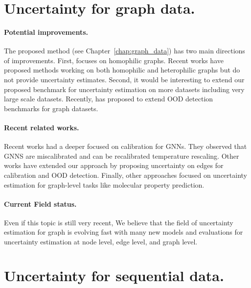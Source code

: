 \section{Uncertainty for graph data.}

\paragraph{Potential improvements.} The proposed method \GPNacro{} (see Chapter~\ref{chap:graph_data}) has two main directions of improvements. First, \GPNacro{} focuses on homophilic graphs. Recent works have proposed methods \cite{bodnar2022sheaf, giovanni2022graff} working on both homophilic and heterophilic graphs but do not provide uncertainty estimates. Second, it would be interesting to extend our proposed benchmark for uncertainty estimation on more datasets including very large scale datasets. Recently, \cite{gui2022good} has proposed to extend OOD detection benchmarks for graph datasets.


\paragraph{Recent related works.} Recent works \cite{texeira2019GNNmiscalibrated, hsu2022GNNmiscalibrated, wang2021confident} had a deeper focused on calibration for GNNs. They observed that GNNS are miscalibrated and can be recalibrated temperature rescaling. Other works \cite{zhou2022OODlink, hsu2022structure} have extended our approach by proposing uncertainty on edges for calibration and OOD detection. Finally, other approaches \cite{soleimany2021evidential} focused on uncertainty estimation for graph-level tasks like molecular property prediction.

\paragraph{Current Field status.} Even if this topic is still very recent, We believe that the field of uncertainty estimation for graph is evolving fast with many new models and evaluations for uncertainty estimation at node level, edge level, and graph level. 

\section{Uncertainty for sequential data.}

